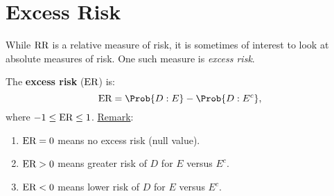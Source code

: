 \section{Excess Risk}
While $ \text{RR} $ is a relative measure of risk, it is sometimes of
interest to look at absolute measures of risk. One such
measure is \emph{excess risk}.
\begin{Regular}{}
    The \textbf{excess risk} ($ \text{ER} $) is:
    \[ \ER=\Prob{D\given E}-\Prob{D\given E^c}, \]
    where $ -1\le \text{ER}\le 1 $.
    \tcblower{}
    \underline{Remark}:
    \begin{enumerate}[(1)]
        \item $ \text{ER}=0 $ means no excess risk (null value).
        \item $ \text{ER}>0 $ means greater risk of $ D $ for $ E $ versus $ E^c $.
        \item $ \text{ER}<0 $ means lower risk of $ D $ for $ E $ versus $ E^c $.
    \end{enumerate}
\end{Regular}
